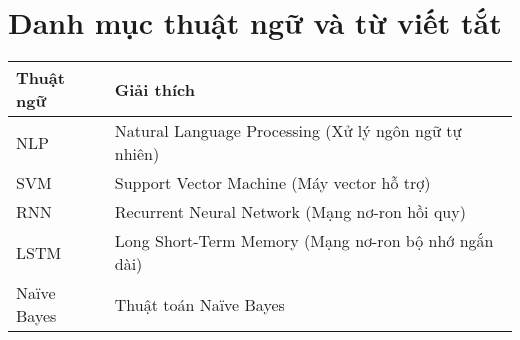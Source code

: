 \chapter*{Danh mục thuật ngữ và từ viết tắt}

\begin{tabular}{|l|l|}
    \hline
    \textbf{Thuật ngữ} & \textbf{Giải thích} \\ \hline
    NLP & Natural Language Processing (Xử lý ngôn ngữ tự nhiên) \\ \hline
    SVM & Support Vector Machine (Máy vector hỗ trợ) \\ \hline
    RNN & Recurrent Neural Network (Mạng nơ-ron hồi quy) \\ \hline
    LSTM & Long Short-Term Memory (Mạng nơ-ron bộ nhớ ngắn dài) \\ \hline
    Naïve Bayes & Thuật toán Naïve Bayes \\ \hline
\end{tabular}
